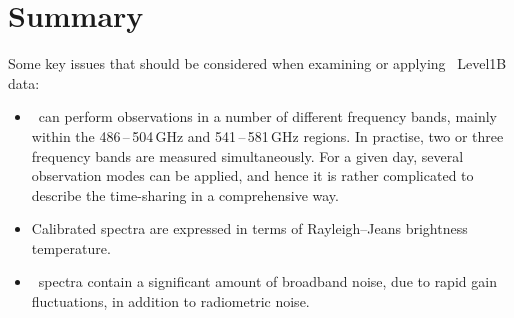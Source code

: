     




\chapter{Summary}


Some key issues that should be considered when examining or applying \smr\
Level1B data:
\begin{itemize}

\item \smr\ can perform observations in a number of different frequency
bands, mainly within the 486\,--\,504\,GHz and 541\,--\,581\,GHz regions.
In practise, two or three frequency bands are measured simultaneously.
For a given day, several observation modes can be applied, and hence
it is rather complicated to describe the time-sharing in a 
comprehensive way.
 

\item Calibrated spectra are expressed in terms of Rayleigh--Jeans brightness temperature.

\item \smr\ spectra contain a significant amount of broadband noise, 
due to rapid gain fluctuations, in addition to radiometric noise.


\end{itemize}

